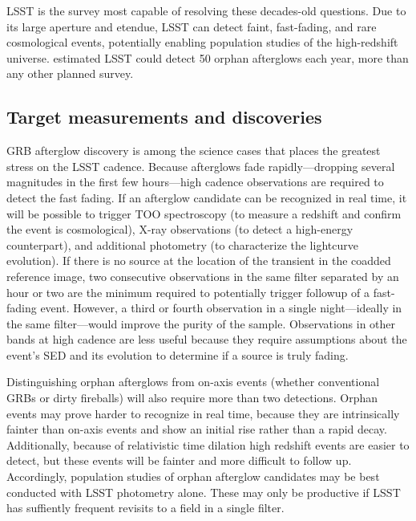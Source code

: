 LSST is the survey most capable of resolving these decades-old questions.  Due to its large aperture and etendue, LSST can detect faint, fast-fading, and rare cosmological events, potentially enabling population studies of the high-redshift universe.  
\citet{2015A&A...578A..71G} estimated LSST could detect 50 orphan afterglows each year, more than any other planned survey.





\subsection{Target measurements and discoveries}
\label{sec:\secname:targets}

GRB afterglow discovery is among the science cases that places the greatest stress on the LSST cadence.  Because afterglows fade rapidly---dropping several magnitudes in the first few hours---high cadence observations are required to detect the fast fading.  
If an afterglow candidate can be recognized in real time, it will be possible to trigger TOO spectroscopy (to measure a redshift and confirm the event is cosmological), X-ray observations (to detect a high-energy counterpart), and additional photometry (to characterize the lightcurve evolution).  If there is no source at the location of the transient in the coadded reference image, two consecutive observations in the same filter separated by an hour or two are the minimum required to potentially trigger followup of a fast-fading event.  
However, a third or fourth observation in a single night---ideally in the same filter---would improve the purity of the sample.  Observations in other bands at high cadence are less useful because they require assumptions about the event's SED and its evolution to determine if a source is truly fading.

Distinguishing orphan afterglows from on-axis events (whether conventional GRBs or dirty fireballs) will also require more than two detections.  Orphan events may prove harder to recognize in real time, because they are intrinsically fainter than on-axis events and show an initial rise rather than a rapid decay.  
Additionally, because of relativistic time dilation high redshift events are easier to detect, but these events will be fainter and more difficult to follow up.
Accordingly, population studies of orphan afterglow candidates may be best conducted with LSST photometry alone.  These may only be productive if LSST has suffiently frequent revisits to a field in a single filter.


